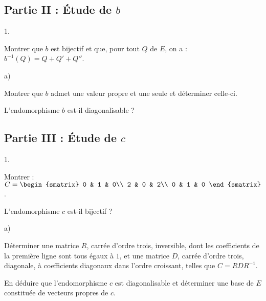 \documentclass[11pt]{article}%
\begin{document}


\subsection*{Partie II : Étude de $b$}

\begin{noliste}{1.}
  \setlength{\itemsep}{2mm} %
  \setcounter{enumi}{3}
\item Montrer que $b$ est bijectif et que, pour tout $Q$ de $E$, on a
  : $b^{-1}(Q) = Q + Q' + Q''$.

  




\item 
  \begin{noliste}{a)}
  \item Montrer que $b$ admet une valeur propre et une seule et
    déterminer celle-ci.
	
    
    
  \item L'endomorphisme $b$ est-il diagonalisable ?
    
    
  \end{noliste}
\end{noliste}

\subsection*{Partie III : Étude de $c$}

\begin{noliste}{1.}
\setlength{\itemsep}{2mm}
\setcounter{enumi}{5}
\item Montrer : $C=\begin{smatrix}
0 & 1 & 0\\ 
2 & 0 & 2\\ 
0 & 1 & 0
\end{smatrix}$.



\item L'endomorphisme $c$ est-il bijectif ?

  




\item 
  \begin{noliste}{a)}
  \item Déterminer une matrice $R$, carrée d'ordre trois, inversible,
    dont les coefficients de la première ligne sont tous égaux à $1$,
    et une matrice $D$, carrée d'ordre trois, diagonale, à
    coefficients diagonaux dans l'ordre croissant, telles que $C =
    RDR^{-1}$.
    
    
    


	
  \item En déduire que l'endomorphisme $c$ est diagonalisable et
    déterminer une base de $E$ constituée de vecteurs propres de
    $c$.
    
    
  \end{noliste}
\end{noliste}
\end{document}
